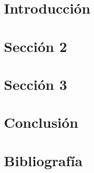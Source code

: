 



\thispagestyle{empty}

\newpage

\def\@roman#1{\romannumeral #1} %

\tableofcontents
\newpage



\section{Introducción}\label{sec:1}
    
    \newpage

\section{Sección 2}\label{sec:2}
    
    \newpage
    
\section{Sección 3}\label{sec:3}
    
    \newpage

\section{Conclusión}\label{sec:4}
    
    \newpage 
    
\section{Bibliografía}\label{sec:5}
    
    \newpage  

